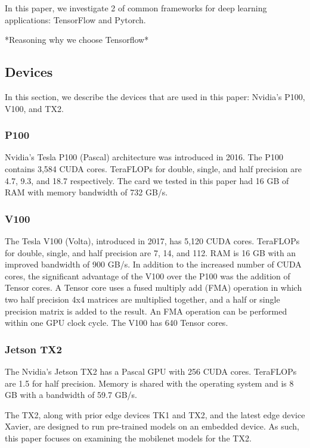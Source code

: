 \documentclass[conference]{IEEEtran}
\begin{document}
In this paper, we investigate 2 of common frameworks for deep learning applications: TensorFlow and Pytorch.

*Reasoning why we choose Tensorflow*

\subsection{Devices}
In this section, we describe the devices that are used in this paper: Nvidia's P100, V100, and TX2.

\subsubsection{P100}

Nvidia's Tesla P100 (Pascal) architecture was introduced in 2016. The P100 contains 3,584 CUDA cores. TeraFLOPs for double, single, and half precision are 4.7, 9.3, and 18.7 respectively. The card we tested in this paper had 16 GB of RAM with memory bandwidth of  732 GB/s.

\subsubsection{V100}

The Tesla V100 (Volta), introduced in 2017, has 5,120 CUDA cores. TeraFLOPs for double, single, and half precision are 7, 14, and 112. RAM is 16 GB with an improved bandwidth of 900 GB/s. In addition to the increased number of CUDA cores, the significant advantage of the V100 over the P100 was the addition of Tensor cores. A Tensor core uses a fused multiply add (FMA) operation in which two half precision 4x4 matrices are multiplied together, and a half or single precision matrix is added to the result. An FMA operation can be performed within one GPU clock cycle. The V100 has 640 Tensor cores.

\subsubsection{Jetson TX2}

The Nvidia's Jetson TX2 has a Pascal GPU with 256 CUDA cores. TeraFLOPs are 1.5 for half precision. Memory is shared with the operating system and is 8 GB with a bandwidth of 59.7 GB/s.

The TX2, along with prior edge devices TK1 and TX2, and the latest edge device Xavier, are designed to run pre-trained models on an embedded device. As such, this paper focuses on examining the mobilenet models for the TX2.
\end{document}
